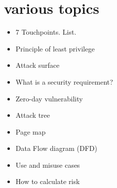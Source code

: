 \chapter{various topics}
	\begin{itemize}
		\item 7 Touchpoints. List.
		\item Principle of least privilege
		\item Attack surface
		\item What is a security requirement?
		\item Zero-day vulnerability
		\item Attack tree
		\item Page map
		\item Data Flow diagram (DFD)
		\item Use and misuse cases
		\item How to calculate risk

	\end{itemize}